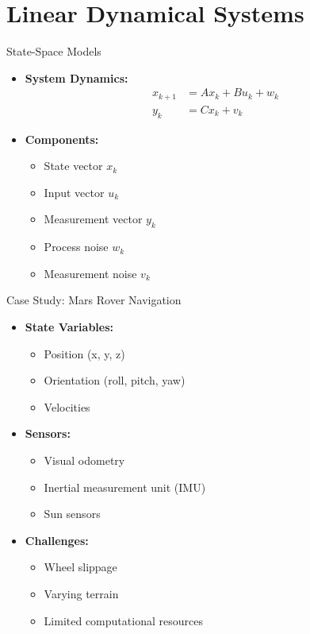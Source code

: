 \documentclass[aspectratio=169]{beamer}
\begin{document}
\section{Linear Dynamical Systems}

\begin{frame}{State-Space Models}
    \begin{itemize}
        \item<1-> \textbf{System Dynamics:}
            \begin{align*}
                x_{k+1} &= Ax_k + Bu_k + w_k \\
                y_k &= Cx_k + v_k
            \end{align*}
        \item<2-> \textbf{Components:}
            \begin{itemize}
                \item State vector $x_k$
                \item Input vector $u_k$
                \item Measurement vector $y_k$
                \item Process noise $w_k$
                \item Measurement noise $v_k$
            \end{itemize}
    \end{itemize}
\end{frame}

\begin{frame}{Case Study: Mars Rover Navigation}
    \begin{itemize}
        \item<1-> \textbf{State Variables:}
            \begin{itemize}
                \item Position (x, y, z)
                \item Orientation (roll, pitch, yaw)
                \item Velocities
            \end{itemize}
        \item<2-> \textbf{Sensors:}
            \begin{itemize}
                \item Visual odometry
                \item Inertial measurement unit (IMU)
                \item Sun sensors
            \end{itemize}
        \item<3-> \textbf{Challenges:}
            \begin{itemize}
                \item Wheel slippage
                \item Varying terrain
                \item Limited computational resources
            \end{itemize}
    \end{itemize}
\end{frame}
\end{document}
